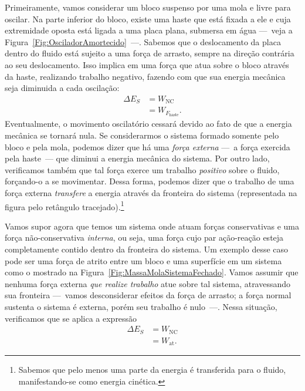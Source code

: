 Primeiramente, vamos considerar um bloco suspenso por uma mola e livre para oscilar. Na parte inferior do bloco, existe uma haste que está fixada a ele e cuja extremidade oposta está ligada a uma placa plana, submersa em água ---~veja a Figura~\ref{Fig:OsciladorAmortecido}~---. Sabemos que o deslocamento da placa dentro do fluido está sujeito a uma força de arrasto, sempre na direção contrária ao seu deslocamento. Isso implica em uma força que atua sobre o bloco através da haste, realizando trabalho negativo, fazendo com que sua energia mecânica seja diminuida a cada oscilação:
\begin{align}
    \Delta E_S &= W_{\textrm{NC}} \\
    &= W_{F_{\textrm{haste}}}.
\end{align}
%
Eventualmente, o movimento oscilatório cessará devido ao fato de que a energia mecânica se tornará nula. Se considerarmos o sistema formado somente pelo bloco e pela mola, podemos dizer que há uma \emph{força externa} ---~a força exercida pela haste~--- que diminui a energia mecânica do sistema. Por outro lado, verificamos também que tal força exerce um trabalho \emph{positivo} sobre o fluido, forçando-o a se movimentar. Dessa forma, podemos dizer que o trabalho de uma força externa \emph{transfere} a energia através da fronteira do sistema (representada na figura pelo retângulo tracejado).\footnote{Sabemos que pelo menos uma parte da energia é transferida para o fluido, manifestando-se como energia cinética.}

Vamos supor agora que temos um sistema onde atuam forças conservativas e uma força não-conservativa \emph{interna}, ou seja, uma força cujo par ação-reação esteja completamente contido dentro da fronteira do sistema. Um exemplo desse caso pode ser uma força de atrito entre um bloco e uma superfície em um sistema como o mostrado na Figura~\ref{Fig:MassaMolaSistemaFechado}. Vamos assumir que nenhuma força externa \emph{que realize trabalho} atue sobre tal sistema, atravessando sua fronteira ---~vamos desconsiderar efeitos da força de arrasto; a força normal sustenta o sistema é externa, porém seu trabalho é nulo~---. Nessa situação, verificamos que se aplica a expressão
\begin{align}
    \Delta E_S &= W_{\textrm{NC}} \\
    &= W_{\textrm{at}}.
\end{align}

